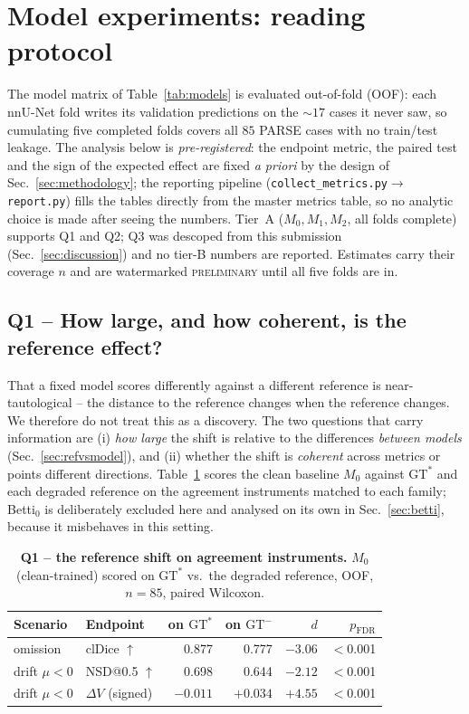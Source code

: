 \documentclass[
    bookmarks, bookmarksnumbered, bookmarksopen,
    colorlinks=true, citecolor=blue, linkcolor=blue, urlcolor=blue
]{techrep}
\newcommand{\gtstar}{\ensuremath{\mathrm{GT}^{\!*}}}
\newcommand{\gtminus}{\ensuremath{\mathrm{GT}^{\!-}}}
\newcommand{\pending}{{\color{red}\small$\langle$pending$\rangle$}}
\newcommand{\QoneOmClDiceStar}{\pending}\newcommand{\QoneOmClDiceMinus}{\pending}
\newcommand{\QoneOmClDiceP}{\pending}\newcommand{\QoneOmClDiceD}{\pending}
\newcommand{\QoneDrNsdStar}{\pending}\newcommand{\QoneDrNsdMinus}{\pending}
\newcommand{\QoneDrNsdD}{\pending}
\newcommand{\QoneDrDvMinus}{\pending}\newcommand{\QoneDrP}{\pending}
\newcommand{\QoneDrDvD}{\pending}\newcommand{\QoneDrDvP}{\pending}
\newcommand{\Ncases}{85}   %
\renewcommand{\QoneOmClDiceStar}{0.877}\renewcommand{\QoneOmClDiceMinus}{0.777}
\renewcommand{\QoneOmClDiceP}{$<$0.001}\renewcommand{\QoneOmClDiceD}{$-3.06$}
\renewcommand{\QoneDrNsdStar}{0.698}\renewcommand{\QoneDrNsdMinus}{0.644}
\renewcommand{\QoneDrNsdD}{$-2.12$}
\renewcommand{\QoneDrDvMinus}{$+0.034$}\renewcommand{\QoneDrP}{$<$0.001}
\renewcommand{\QoneDrDvD}{$+4.55$}\renewcommand{\QoneDrDvP}{$<$0.001}
\begin{document}
\section{Model experiments: reading protocol}
The model matrix of Table~\ref{tab:models} is evaluated out-of-fold (OOF): each nnU-Net
fold writes its validation predictions on the $\sim17$ cases it never saw, so cumulating
five completed folds covers all $\Ncases$ PARSE cases with no train/test leakage. The
analysis below is \emph{pre-registered}: the endpoint metric, the paired test and the
sign of the expected effect are fixed \emph{a priori} by the design of
Sec.~\ref{sec:methodology}; the reporting pipeline
(\texttt{collect\_metrics.py}$\to$\texttt{report.py}) fills the tables directly from the
master metrics table, so no analytic choice is made after seeing the numbers. Tier~A
($M_0,M_1,M_2$, all folds complete) supports Q1 and Q2; Q3 was descoped from this
submission (Sec.~\ref{sec:discussion}) and no tier-B numbers are reported. Estimates carry their coverage $n$ and are watermarked
\textsc{preliminary} until all five folds are in.

\subsection{Q1 -- How large, and how coherent, is the reference effect?}
\label{sec:q1}
That a fixed model scores differently against a different reference is near-tautological -- the
distance to the reference changes when the reference changes. We therefore do not treat this as
a discovery. The two questions that carry information are (i) \emph{how large} the shift is
relative to the differences \emph{between models} (Sec.~\ref{sec:refvsmodel}), and (ii) whether
the shift is \emph{coherent} across metrics or points different directions. Table~\ref{tab:q1}
scores the clean baseline $M_0$ against $\gtstar$ and each degraded reference on the agreement
instruments matched to each family; Betti$_0$ is deliberately excluded here and analysed on its
own in Sec.~\ref{sec:betti}, because it misbehaves in this setting.

\begin{table}[t]
  \centering
  \caption{\textbf{Q1 -- the reference shift on agreement instruments.} $M_0$ (clean-trained)
  scored on $\gtstar$ vs.\ the degraded reference, OOF, $n{=}\Ncases$, paired Wilcoxon.}
  \label{tab:q1}
  \small
  \begin{tabular}{llrrrr}
    \toprule
    Scenario & Endpoint & on $\gtstar$ & on $\gtminus$ & $d$ & $p_{\text{FDR}}$ \\
    \midrule
    omission & clDice $\uparrow$ & \QoneOmClDiceStar & \QoneOmClDiceMinus & \QoneOmClDiceD & \QoneOmClDiceP \\
    drift $\mu{<}0$ & NSD@0.5 $\uparrow$ & \QoneDrNsdStar & \QoneDrNsdMinus & \QoneDrNsdD & \QoneDrP \\
    drift $\mu{<}0$ & $\Delta V$ (signed) & $-0.011$ & \QoneDrDvMinus & \QoneDrDvD & \QoneDrDvP \\
    \bottomrule
  \end{tabular}
\end{table}
\end{document}
